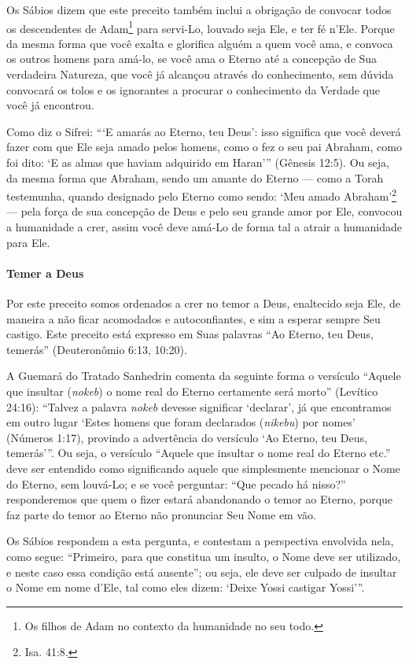 Os Sábios dizem que este preceito também inclui a obrigação de convocar todos os descendentes de Adam\footnote{Os filhos de Adam no contexto da humanidade no seu todo.} para servi-Lo,
louvado seja Ele, e ter
fé n'Ele. Porque da mesma forma que você exalta e glorifica alguém a
quem você ama, e convoca os outros homens para amá-lo, se você ama o Eterno
até a concepção de Sua verdadeira Natureza, que você já alcançou através do
conhecimento, sem dúvida convocará os tolos e os ignorantes a procurar
o conhecimento da Verdade que você já encontrou.

Como diz o Sifrei: ```E amarás ao Eterno, teu Deus': isso significa que
você deverá fazer com que Ele seja amado pelos homens, como o fez o seu
pai Abraham, como foi dito: `E as almas que haviam adquirido em Haran'''
(Gênesis 12:5). Ou seja, da mesma forma que Abraham, sendo um amante do
Eterno --- como a Torah testemunha, quando designado pelo Eterno como
sendo: `Meu amado Abraham'\footnote{Isa. 41:8.} --- pela força de sua
concepção de Deus e pelo seu grande amor por Ele, convocou a humanidade a crer, assim você deve amá-Lo de forma tal a atrair a humanidade para Ele.

\paragraph{Temer a Deus}

Por este preceito somos ordenados a crer no temor a Deus, enaltecido
seja Ele, de maneira a não ficar acomodados e autoconfiantes, e sim a
esperar sempre Seu castigo. Este preceito está expresso em Suas
palavras ``Ao Eterno, teu Deus, temerás'' (Deuteronômio 6:13, 10:20).

A Guemará do Tratado Sanhedrin comenta da seguinte forma o versículo
``Aquele que insultar (\emph{nokeb}) o nome real do Eterno certamente
será morto'' (Levítico 24:16): ``Talvez a palavra \emph{nokeb} devesse
significar `declarar', já que encontramos em outro lugar `Estes homens
que foram declarados (\emph{nikebu}) por nomes' (Números 1:17), provindo
a advertência do versículo `Ao Eterno, teu Deus, temerás'''. Ou seja, o
versículo ``Aquele que insultar o nome real do Eterno etc.'' deve ser
entendido como significando aquele que simplesmente mencionar o Nome do
Eterno, sem louvá-Lo; e se você perguntar: ``Que pecado há nisso?'' responderemos que quem o fizer estará abandonando o temor
ao Eterno, porque faz parte do temor ao Eterno não pronunciar Seu Nome
em vão.

Os Sábios respondem a esta pergunta, e contestam a perspectiva envolvida
nela, como segue: ``Primeiro, para que constitua um insulto, o Nome deve
ser utilizado, e neste caso essa condição está ausente''; ou seja, ele
deve ser culpado de insultar o Nome em nome d'Ele, tal como eles dizem:
`Deixe Yossi castigar Yossi'''.


